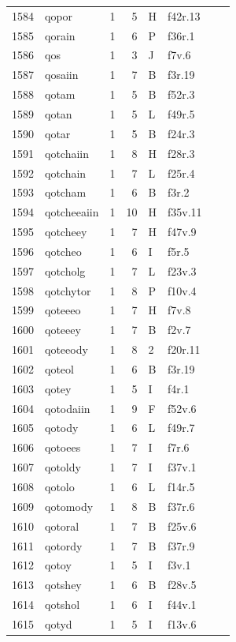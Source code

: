 \documentclass[11pt,a4paper]{article}
\begin{document}
\begin{landscape}
\begin{longtable}{@{}r>{\ttfamily}lrrl>{\ttfamily}l>{\raggedright\arraybackslash}p{80mm}>{\raggedright\arraybackslash}p{36mm}@{}}
1584 & qopor & 1 & 5 & H & f42r.13 &  & \\
1585 & qorain & 1 & 6 & P & f36r.1 &  & \\
1586 & qos & 1 & 3 & J & f7v.6 &  & \\
1587 & qosaiin & 1 & 7 & B & f3r.19 &  & \\
1588 & qotam & 1 & 5 & B & f52r.3 &  & \\
1589 & qotan & 1 & 5 & L & f49r.5 &  & \\
1590 & qotar & 1 & 5 & B & f24r.3 &  & \\
1591 & qotchaiin & 1 & 8 & H & f28r.3 &  & \\
1592 & qotchain & 1 & 7 & L & f25r.4 &  & \\
1593 & qotcham & 1 & 6 & B & f3r.2 &  & \\
1594 & qotcheeaiin & 1 & 10 & H & f35v.11 &  & \\
1595 & qotcheey & 1 & 7 & H & f47v.9 &  & \\
1596 & qotcheo & 1 & 6 & I & f5r.5 &  & \\
1597 & qotcholg & 1 & 7 & L & f23v.3 &  & \\
1598 & qotchytor & 1 & 8 & P & f10v.4 &  & \\
1599 & qoteeeo & 1 & 7 & H & f7v.8 &  & \\
1600 & qoteeey & 1 & 7 & B & f2v.7 &  & \\
1601 & qoteeody & 1 & 8 & 2 & f20r.11 &  & \\
1602 & qoteol & 1 & 6 & B & f3r.19 &  & \\
1603 & qotey & 1 & 5 & I & f4r.1 &  & \\
1604 & qotodaiin & 1 & 9 & F & f52v.6 &  & \\
1605 & qotody & 1 & 6 & L & f49r.7 &  & \\
1606 & qotoees & 1 & 7 & I & f7r.6 &  & \\
1607 & qotoldy & 1 & 7 & I & f37v.1 &  & \\
1608 & qotolo & 1 & 6 & L & f14r.5 &  & \\
1609 & qotomody & 1 & 8 & B & f37r.6 &  & \\
1610 & qotoral & 1 & 7 & B & f25v.6 &  & \\
1611 & qotordy & 1 & 7 & B & f37r.9 &  & \\
1612 & qotoy & 1 & 5 & I & f3v.1 &  & \\
1613 & qotshey & 1 & 6 & B & f28v.5 &  & \\
1614 & qotshol & 1 & 6 & I & f44v.1 &  & \\
1615 & qotyd & 1 & 5 & I & f13v.6 &  & \\

\end{longtable}
\end{landscape}
\end{document}
